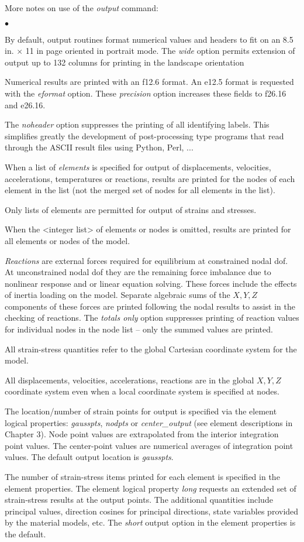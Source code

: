 \documentclass[11pt]{report}
\numberwithin{equation}{section}
\newcommand{\nin} {\noindent}
\newcommand{\ti}{\emph}
\newcommand{\tl}{\textless\xspace}
\newcommand{\tg}{\textgreater\xspace}
\newcommand{\squishlist}{
 \begin{list}{$\bullet$}
  { \setlength{\itemsep}{0pt}
     \setlength{\parsep}{3pt}
     \setlength{\topsep}{3pt}
     \setlength{\partopsep}{0pt}
     \setlength{\leftmargin}{1.5em}
     \setlength{\labelwidth}{1em}
     \setlength{\labelsep}{0.5em} } }
\newcommand{\squishend}{
  \end{list}  }
\begin{document}
\nin More notes on use of the \ti{output} command:
\small
\squishlist
\item By default, output routines  format numerical values and headers
to fit on an 8.5 in. $\times$ 11 in page oriented in portrait mode. The \ti{wide} option
permits extension of output up to 132 columns for printing in the
landscape orientation
\item Numerical results are printed with an f12.6 format. An e12.5 format is
requested with the \ti{eformat} option. These \ti{precision} option increases these fields
to f26.16 and e26.16.
\item The \ti{noheader} option suppresses the printing of all identifying labels.
This simplifies greatly the development of post-processing type programs that
read through the ASCII result files using Python, Perl, ...
\item When a list of \ti{elements} is specified for output of displacements,
velocities, accelerations, temperatures or reactions, results are printed for the nodes
of each element in the list (not the merged set of nodes for all elements in the
list). 
\item Only lists of elements are permitted for output of strains and stresses.
\item When the \tl{integer list}\tg of elements or nodes is omitted, results are
printed for all elements or nodes of the model.
\item \ti{Reactions} are external forces required for equilibrium at constrained
nodal dof. At unconstrained nodal dof they are the remaining force imbalance
due to nonlinear response and or linear equation solving. These forces include
the effects of inertia loading on the model. Separate algebraic sums of the $X, Y,
 Z$ components of these forces are printed following the nodal results to assist
in the checking of reactions. The \ti{totals only} option suppresses printing of
reaction values for individual nodes in the node list -- only the summed values
are printed. 
\item All strain-stress quantities refer to the global Cartesian coordinate
system for the model. 
\item All displacements, velocities, accelerations, reactions are in the global
$X, Y, Z$ coordinate system even when a local coordinate system is specified at
nodes.
\item The location/number of strain points for output is specified via the element
logical properties: \ti{gausspts}, \ti{nodpts} or \ti{center\_output} (see element
descriptions in Chapter 3). Node point values are
extrapolated from the interior integration point values. The center-point values are numerical
averages of integration point values. The default output location is \ti{gausspts}.
\item The number of strain-stress items printed for each element is specified in the element
properties. The element logical property \ti{long} requests an extended
set of strain-stress results at the output points. The additional quantities
include principal values, direction cosines for principal directions, state variables provided
by the material models, etc. The \ti{short} output option in the element properties
is the default. 
\squishend
\normalsize
\end{document}
